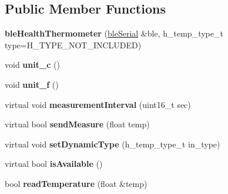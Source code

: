 \subsection*{Public Member Functions}
\begin{DoxyCompactItemize}
\item 
\hypertarget{classble_health_thermometer_a92480888b6ed2b0fe354cc4a5404a63d}{{\bfseries ble\-Health\-Thermometer} (\hyperlink{classble_serial}{ble\-Serial} \&ble, h\-\_\-temp\-\_\-type\-\_\-t type=H\-\_\-\-T\-Y\-P\-E\-\_\-\-N\-O\-T\-\_\-\-I\-N\-C\-L\-U\-D\-E\-D)}\label{classble_health_thermometer_a92480888b6ed2b0fe354cc4a5404a63d}

\item 
\hypertarget{classble_health_thermometer_a0f00efd291e5b91fef286071d3441172}{void {\bfseries unit\-\_\-c} ()}\label{classble_health_thermometer_a0f00efd291e5b91fef286071d3441172}

\item 
\hypertarget{classble_health_thermometer_aafe2468db4033c905394da1d58c83620}{void {\bfseries unit\-\_\-f} ()}\label{classble_health_thermometer_aafe2468db4033c905394da1d58c83620}

\item 
\hypertarget{classble_health_thermometer_acd9cde127f632f06615382b3d03299fd}{virtual void {\bfseries measurement\-Interval} (uint16\-\_\-t sec)}\label{classble_health_thermometer_acd9cde127f632f06615382b3d03299fd}

\item 
\hypertarget{classble_health_thermometer_a09413d493022f3c52dfd269cf01bacd1}{virtual bool {\bfseries send\-Measure} (float temp)}\label{classble_health_thermometer_a09413d493022f3c52dfd269cf01bacd1}

\item 
\hypertarget{classble_health_thermometer_a32d3cdc9efb78bed4a5ed728cdb93846}{virtual void {\bfseries set\-Dynamic\-Type} (h\-\_\-temp\-\_\-type\-\_\-t in\-\_\-type)}\label{classble_health_thermometer_a32d3cdc9efb78bed4a5ed728cdb93846}

\item 
\hypertarget{classble_health_thermometer_a39b5e5ae997a87c7393e363cb540c421}{virtual bool {\bfseries is\-Available} ()}\label{classble_health_thermometer_a39b5e5ae997a87c7393e363cb540c421}

\item 
\hypertarget{classble_health_thermometer_a8d54f2c7e49f12ca5846e55dcab0ab3b}{bool {\bfseries read\-Temperature} (float \&temp)}\label{classble_health_thermometer_a8d54f2c7e49f12ca5846e55dcab0ab3b}

\end{DoxyCompactItemize}
